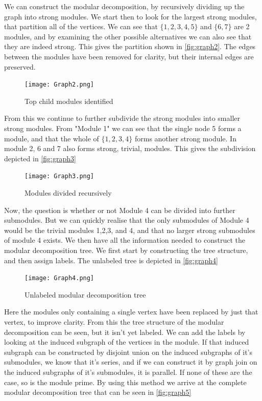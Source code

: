 \documentclass[a4paper]{article}
\begin{document}
We can construct the modular decomposition, by recursively dividing up the graph
into strong modules. We start then to look for the largest strong modules, that
partition all of the vertices. We can see that $\{1,2,3,4,5\}$ and $\{6,7\}$
are 2 modules, and by examining the other possible alternatives we can also
see that they are indeed strong. This gives the partition shown in 
\autoref{fig:graph2}. The edges between the modules have been removed for
clarity, but their internal edges are preserved.

\begin{figure}[H]
    \texttt{[image: Graph2.png]}
    \caption{Top child modules identified}
    \label{fig:graph2}
\end{figure}

From this we continue to further subdivide the strong modules into smaller
strong modules. From "Module 1" we can see that the single node 5 forms a
module, and that the whole of $\{1,2,3,4\}$ forms another strong module.
In module 2, 6 and 7 also forms strong, trivial, modules. This gives the
subdivision depicted in \autoref{fig:graph3}

\begin{figure}[H]
    \texttt{[image: Graph3.png]}
    \caption{Modules divided recursively}
    \label{fig:graph3}
\end{figure}

Now, the question is whether or not Module 4 can be divided into further
submodules. But we can quickly realise that the only submodules of Module 4
would be the trivial modules 1,2,3, and 4, and that no larger strong submodules
of module 4 exists. We then have all the information needed to construct the
modular decomposition tree. We first start by constructing the tree structure,
and then assign labels. The unlabeled tree is depicted in \autoref{fig:graph4}

\begin{figure}[H]
    \texttt{[image: Graph4.png]}
    \caption{Unlabeled modular decomposition tree}
    \label{fig:graph4}
\end{figure}

Here the modules only containing a single vertex have been replaced by just that
vertex, to improve clarity. From this the tree structure of the modular
decomposition can be seen, but it isn't yet labeled. We can add the labels by 
looking at the induced subgraph of the vertices in the module. If that induced
subgraph can be constructed by disjoint union on the induced subgraphs of it's
submodules, we know that it's series, and if we can construct it by graph join on
the induced subgraphs of it's submodules, it is parallel. If none of these are
the case, so is the module prime. By using this method we arrive at the complete
modular decomposition tree that can be seen in \autoref{fig:graph5}
\end{document}
